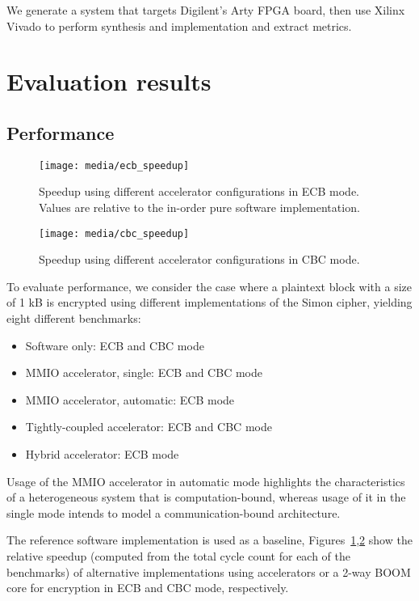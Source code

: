 \documentclass[10pt,conference]{IEEEtran}
\begin{document}
We generate a system that targets Digilent's Arty FPGA board, then use Xilinx
Vivado to perform synthesis and implementation and extract metrics.

\section{Evaluation results}

\subsection{Performance}

\begin{figure}
  \centering
  \texttt{[image: media/ecb\_speedup]}
  \caption{Speedup using different accelerator configurations in ECB mode.
    Values are relative to the in-order pure software implementation.}
  \label{fig:ecbspeedup}
\end{figure}

\begin{figure}
  \centering
  \texttt{[image: media/cbc\_speedup]}
  \caption{Speedup using different accelerator configurations in CBC mode.}
  \label{fig:cbcspeedup}
\end{figure}

To evaluate performance, we consider the case where a plaintext block with a size of
1 kB is encrypted using different implementations of the Simon cipher, yielding
eight different benchmarks:

\begin{itemize}
\item Software only: ECB and CBC mode
\item MMIO accelerator, single: ECB and CBC mode
\item MMIO accelerator, automatic: ECB mode
\item Tightly-coupled accelerator: ECB and CBC mode
\item Hybrid accelerator: ECB mode
\end{itemize}

Usage of the MMIO accelerator in automatic mode highlights the characteristics
of a heterogeneous system that is computation-bound, whereas usage of it in the
single mode intends to model a communication-bound architecture.

The reference software implementation is used as a baseline,
Figures~\ref{fig:ecbspeedup},\ref{fig:cbcspeedup} show the relative speedup
(computed from the total cycle count for each of the benchmarks) of alternative
implementations using accelerators or a 2-way BOOM core for encryption in ECB
and CBC mode, respectively.
\end{document}
